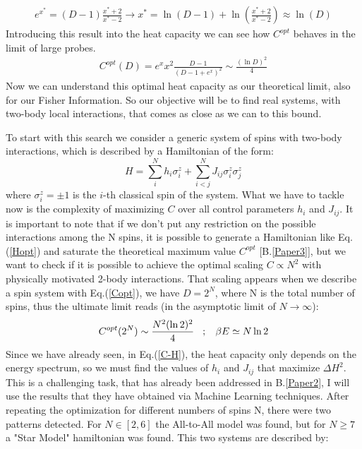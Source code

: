 \documentclass{article}
\begin{document}
\begin{align}
  e^{x^*}=(D-1)\frac{x^*+2}{x^*-2} \rightarrow x^*=\ln(D-1) +\ln\left(\frac{x^*+2}{x^*-2}\right) \approx \ln(D)
\end{align}
Introducing this result into the heat capacity we can see how $C^{opt}$ behaves in the limit of large probes.
\begin{align}
    C^{opt}(D) = e^xx^2\frac{D-1}{\left(D-1+e^{x}\right)^2} \sim \frac{(\ln D)^2}{4}
    \label{Copt}
\end{align}
Now we can understand this optimal heat capacity as our theoretical limit, also for our Fisher Information. So our objective will be to find real systems, with two-body local interactions, that comes as close as we can to this bound.\par
To start with this search we consider a generic system of spins with two-body interactions, which is described by a Hamiltonian of the form:
\begin{equation}
    H = \sum_i^Nh_i\sigma_i^z + \sum_{i<j}^N J_{ij}\sigma_i^z\sigma_j^z
\end{equation}
where $\sigma_i^z = \pm 1$ is the $i$-th classical spin of the system. What we have to tackle now is the complexity of maximizing $C$ over all control parameters $h_i$ and $J_{ij}$. It is important to note that if we don't put any restriction on the possible interactions among the N spins, it is possible to generate a Hamiltonian like Eq.(\ref{Hopt}) and saturate the theoretical maximum value $C^{opt}$ [B.\ref{Paper3}], but we want to check if it is possible to achieve the optimal scaling $C\propto N^2$ with physically motivated 2-body interactions. That scaling appears when we describe a spin system with Eq.(\ref{Copt}), we have $D=2^N$, where N is the total number of spins, thus the ultimate limit reads (in the asymptotic limit of $N\to \infty$):
\begin{equation}
    C^{opt}(2^N)\sim \frac{N^2(\ln2)^2}{4} \hspace{0.3cm};\hspace{0.3cm} \beta E \simeq N\ln2
\end{equation}
Since we have already seen, in Eq.(\ref{C-H}), the heat capacity only depends on the energy spectrum, so we must find the values of $h_i$ and $J_{ij}$ that maximize $\Delta H^2$. This is a challenging task, that has already been addressed in B.\ref{Paper2}, I will use the results that they have obtained via Machine Learning techniques. After repeating the optimization for different numbers of spins N, there were two patterns detected. For $N\in[2,6]$ the All-to-All model was found, but for $N\geq7$  a "Star Model" hamiltonian was found. This two systems are described by:
\end{document}
